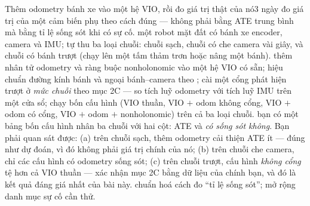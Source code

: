\documentclass[../../vslam.tex]{subfiles}
\begin{document}
\begin{duan}{Thêm odometry bánh xe vào một hệ VIO, rồi đo giá trị thật của nó}{3 ngày}
\dmt đo giá trị của một cảm biến phụ theo cách đúng --- không phải bằng ATE trung bình mà bằng tỉ lệ sống sót khi có sự cố.
\ddl một robot mặt đất có bánh xe encoder, camera và IMU; tự thu ba loại chuỗi: chuỗi sạch, chuỗi có che camera vài giây, và chuỗi có bánh trượt (chạy lên một tấm thảm trơn hoặc nâng một bánh).
\dbc thêm nhân tử odometry và ràng buộc nonholonomic vào một hệ VIO có sẵn; hiệu chuẩn đường kính bánh và ngoại bánh--camera theo ; cài một cổng phát hiện trượt ở \emph{mức chuỗi} theo mục 2C --- so tích luỹ odometry với tích luỹ IMU trên một cửa sổ; chạy bốn cấu hình (VIO thuần, VIO \(+\) odom không cổng, VIO \(+\) odom có cổng, VIO \(+\) odom \(+\) nonholonomic) trên cả ba loại chuỗi.
\dxk bạn có một bảng bốn cấu hình nhân ba chuỗi với hai cột: ATE và \emph{có sống sót không}. Bạn phải quan sát được: (a) trên chuỗi sạch, thêm odometry cải thiện ATE ít --- đúng như dự đoán, vì đó không phải giá trị chính của nó; (b) trên chuỗi che camera, chỉ các cấu hình có odometry sống sót; (c) trên chuỗi trượt, cấu hình \emph{không cổng} tệ hơn cả VIO thuần --- xác nhận mục 2C bằng dữ liệu của chính bạn, và đó là kết quả đáng giá nhất của bài này.
\dnv {} chuẩn hoá cách đo ``tỉ lệ sống sót'';  mở rộng danh mục sự cố cần thử.
\end{duan}
\end{document}
